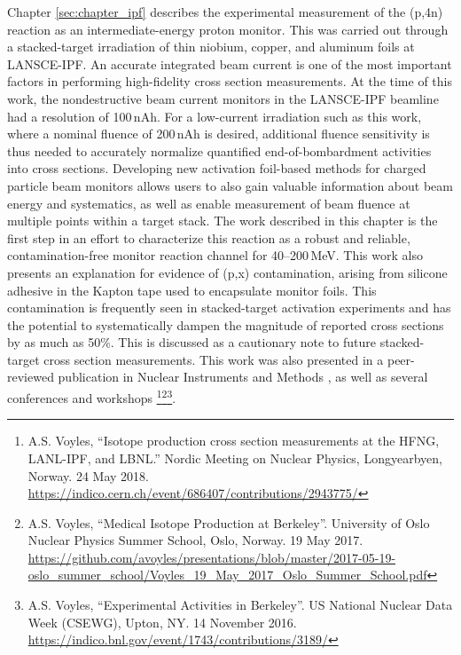 Chapter \ref{sec:chapter_ipf}  describes the experimental measurement of the (p,4n) reaction as an intermediate-energy proton monitor.
This was carried out through a stacked-target irradiation of thin niobium, copper, and aluminum foils at LANSCE-IPF.
An accurate integrated beam current is one of the most important factors in performing high-fidelity cross section measurements.
At the time of this work, the nondestructive beam current monitors in the LANSCE-IPF beamline had a  resolution of 100\,nAh.
For a low-current irradiation such as this work, where a nominal fluence of 200\,nAh is desired, additional fluence sensitivity is thus needed to accurately normalize quantified end-of-bombardment activities into cross sections.
Developing  new activation foil-based methods for charged particle beam monitors allows users to also gain valuable information about beam energy and systematics, as well as enable measurement of beam fluence at multiple points within a target stack.
The work described in this chapter is the first step in an effort to characterize this reaction as a robust and reliable, contamination-free monitor reaction channel for 40--200\,MeV.
This work also presents an explanation for evidence of (p,x) contamination, arising from silicone adhesive in the Kapton tape used to encapsulate monitor foils. 
This contamination is frequently seen in stacked-target activation experiments and has the potential to systematically dampen the magnitude of reported cross sections by as much as 50\%. 
This is discussed as a cautionary note to future stacked-target cross section measurements.
This work was also presented in a peer-reviewed publication in Nuclear Instruments and Methods \cite{Voyles2018a}, as well as several conferences and workshops \footnote{A.S. Voyles, \enquote{Isotope production cross section measurements at the HFNG, LANL-IPF, and LBNL.}    Nordic Meeting on Nuclear Physics, Longyearbyen, Norway. 24 May 2018.  \url{https://indico.cern.ch/event/686407/contributions/2943775/}}\footnote{A.S. Voyles, \enquote{Medical Isotope Production at Berkeley}. University of Oslo Nuclear Physics Summer School, Oslo, Norway.  19 May 2017.  \url{https://github.com/avoyles/presentations/blob/master/2017-05-19-oslo_summer_school/Voyles_19_May_2017_Oslo_Summer_School.pdf}}\footnote{A.S. Voyles, \enquote{Experimental Activities in Berkeley}. US National Nuclear Data Week  (CSEWG), Upton, NY. 14 November 2016.  \url{https://indico.bnl.gov/event/1743/contributions/3189/}}.





